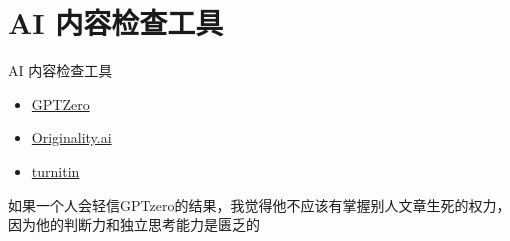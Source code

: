\documentclass[12pt, aspectration=54, UTF8]{beamer}
\begin{document}
\section{AI 内容检查工具}
\begin{frame}{AI 内容检查工具}
\centering
\justifying
    \begin{itemize}
        \item \href{https://app.gptzero.me/app/ai-scan?tab=0}{GPTZero}
        \item \href{https://originality.ai/}{Originality.ai}
        \item \href{https://www.turnitin.com/}{turnitin}
    \end{itemize}
    如果一个人会轻信GPTzero的结果，我觉得他不应该有掌握别人文章生死的权力，因为他的判断力和独立思考能力是匮乏的
    
    
\end{frame}
\end{document}
